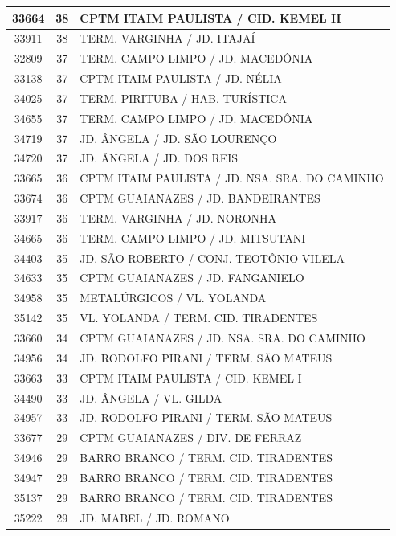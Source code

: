 \documentclass[
	12pt,				%
	oneside,			%
	a4paper,			%
	english,			%
	brazil				%
	]{abntex2ppgsi}
\begin{document}
{{\begin{apendicesenv}
\begin{longtable}{c|c|p{7cm}}
 \hline 
33664 &	38 &	CPTM ITAIM PAULISTA / CID. KEMEL II \\ 
 \hline 
33911 &	38 &	TERM. VARGINHA / JD. ITAJAÍ \\ 
 \hline 
32809 &	37 &	TERM. CAMPO LIMPO / JD. MACEDÔNIA \\ 
 \hline 
33138 &	37 &	CPTM ITAIM PAULISTA / JD. NÉLIA \\ 
 \hline 
34025 &	37 &	TERM. PIRITUBA / HAB. TURÍSTICA \\ 
 \hline 
34655 &	37 &	TERM. CAMPO LIMPO / JD. MACEDÔNIA \\ 
 \hline 
34719 &	37 &	JD. ÂNGELA / JD. SÃO LOURENÇO \\ 
 \hline 
34720 &	37 &	JD. ÂNGELA / JD. DOS REIS \\ 
 \hline 
33665 &	36 &	CPTM ITAIM PAULISTA / JD. NSA. SRA. DO CAMINHO \\ 
 \hline 
33674 &	36 &	CPTM GUAIANAZES / JD. BANDEIRANTES \\ 
 \hline 
33917 &	36 &	TERM. VARGINHA / JD. NORONHA \\ 
 \hline 
34665 &	36 &	TERM. CAMPO LIMPO / JD. MITSUTANI \\ 
 \hline 
34403 &	35 &	JD. SÃO ROBERTO / CONJ. TEOTÔNIO VILELA \\ 
 \hline 
34633 &	35 &	CPTM GUAIANAZES / JD. FANGANIELO \\ 
 \hline 
34958 &	35 &	METALÚRGICOS / VL. YOLANDA \\ 
 \hline 
35142 &	35 &	VL. YOLANDA / TERM. CID. TIRADENTES \\ 
 \hline 
33660 &	34 &	CPTM GUAIANAZES / JD. NSA. SRA. DO CAMINHO \\ 
 \hline 
34956 &	34 &	JD. RODOLFO PIRANI / TERM. SÃO MATEUS \\ 
 \hline 
33663 &	33 &	CPTM ITAIM PAULISTA / CID. KEMEL I \\ 
 \hline 
34490 &	33 &	JD. ÂNGELA / VL. GILDA \\ 
 \hline 
34957 &	33 &	JD. RODOLFO PIRANI / TERM. SÃO MATEUS \\ 
 \hline 
33677 &	29 &	CPTM GUAIANAZES / DIV. DE FERRAZ \\ 
 \hline 
34946 &	29 &	BARRO BRANCO / TERM. CID. TIRADENTES \\ 
 \hline 
34947 &	29 &	BARRO BRANCO / TERM. CID. TIRADENTES \\ 
 \hline 
35137 &	29 &	BARRO BRANCO / TERM. CID. TIRADENTES \\ 
 \hline 
35222 &	29 &	JD. MABEL / JD. ROMANO \\ 
 \hline 

\end{longtable}
\end{apendicesenv}}}
\end{document}

